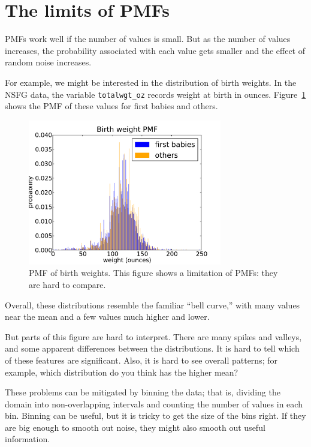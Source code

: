 \documentclass[12pt]{book}
\begin{document}
\section{The limits of PMFs}

PMFs work well if the number of values is small.  But as the
number of values increases, the probability associated with each value
gets smaller and the effect of random noise increases.

For example, we might be interested in the distribution of birth
weights.  In the NSFG data, the variable \verb"totalwgt_oz" records
weight at birth in ounces.  Figure~\ref{nsfg_birthwgt_pmf} shows the
PMF of these values for first babies and others.

\begin{figure}
\centerline{\includegraphics[height=2.5in]{figs/nsfg_birthwgt_pmf.pdf}}
\caption{PMF of birth weights.  This figure shows a limitation
of PMFs: they are hard to compare.}
\label{nsfg_birthwgt_pmf}
\end{figure}

Overall, these distributions resemble the familiar ``bell curve,'' with
many values near the mean and a few values much higher and lower.

But parts of this figure are hard to interpret.  There are many spikes
and valleys, and some apparent differences between the distributions.
It is hard to tell which of these features are significant.  Also, it
is hard to see overall patterns; for example, which distribution do
you think has the higher mean?

These problems can be mitigated by binning the data;
that is, dividing the domain into non-overlapping intervals and counting
the number of values in each bin.  Binning can be useful, but it is
tricky to get the size of the bins right.  If they are big enough to
smooth out noise, they might also smooth out useful information.
\end{document}
